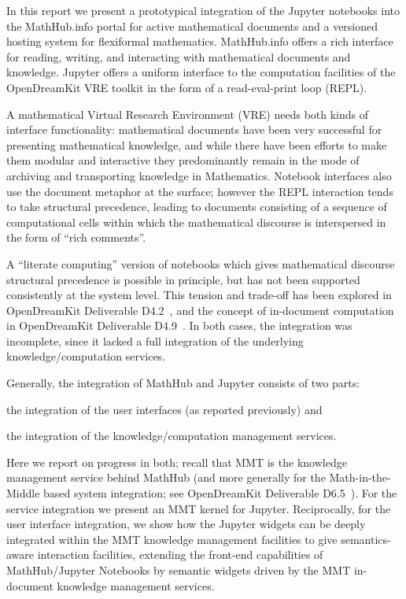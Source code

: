 In this report we present a prototypical integration of the Jupyter notebooks into the MathHub.info portal for active mathematical documents and a versioned hosting system for flexiformal mathematics.
MathHub.info offers a rich interface for reading, writing, and interacting with mathematical documents and knowledge. Jupyter offers a uniform interface to the computation facilities of the OpenDreamKit VRE toolkit in the form of a read-eval-print loop (REPL).

A mathematical Virtual Research Environment (VRE) needs both kinds of interface functionality: mathematical documents have been very successful for presenting mathematical knowledge, and while there have been efforts to make them modular and interactive they predominantly remain in the mode of archiving and transporting knowledge in Mathematics.
Notebook interfaces also use the document metaphor at the surface; however the REPL interaction
tends to take structural precedence, leading to documents consisting of a sequence of computational cells within which the mathematical discourse is interspersed in the form of ``rich comments''.

A ``literate computing'' version of notebooks which gives mathematical discourse structural precedence is possible in principle, but has not been supported consistently at the system level.
This tension and trade-off has been explored in OpenDreamKit Deliverable D4.2~\cite{ODK-D4.2}, and the concept of in-document computation in OpenDreamKit Deliverable D4.9~\cite{ODK-D4.9}.
In both cases, the integration was incomplete, since it lacked a full integration of the
underlying knowledge/computation services.

Generally, the integration of MathHub and Jupyter consists of two parts:
\begin{inparaenum}[\em a\rm )]
\item the integration of the user interfaces (as reported previously) and
\item the integration of the knowledge/computation management services.
\end{inparaenum}
Here we report on progress in both; recall that MMT is the knowledge management service behind MathHub (and more generally for the Math-in-the-Middle based system integration; see OpenDreamKit Deliverable D6.5~\cite{ODK-D6.5}).
%
For the service integration we present an MMT kernel for Jupyter.
%
%
Reciprocally, for the user interface integration, we show how the Jupyter widgets can be deeply integrated within the MMT knowledge management facilities to give semantics-aware interaction facilities, extending the front-end capabilities of MathHub/Jupyter Notebooks by semantic widgets driven by the MMT in-document knowledge management services.

